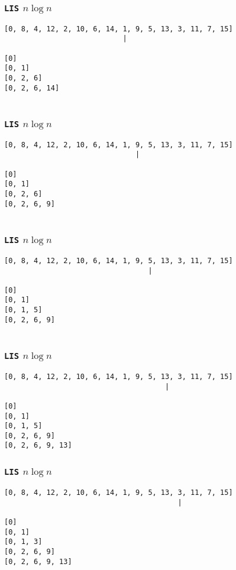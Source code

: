\documentclass{beamer}
\begin{document}
\begin{frame}[fragile]
	\frametitle{\texttt{LIS} $n\log n$}
\begin{verbatim}
[0, 8, 4, 12, 2, 10, 6, 14, 1, 9, 5, 13, 3, 11, 7, 15]
                            |

[0]
[0, 1]
[0, 2, 6]
[0, 2, 6, 14]


\end{verbatim}
\end{frame}
\addtocounter{framenumber}{-1}

\begin{frame}[fragile]
	\frametitle{\texttt{LIS} $n\log n$}
\begin{verbatim}
[0, 8, 4, 12, 2, 10, 6, 14, 1, 9, 5, 13, 3, 11, 7, 15]
                               |

[0]
[0, 1]
[0, 2, 6]
[0, 2, 6, 9]


\end{verbatim}
\end{frame}
\addtocounter{framenumber}{-1}

\begin{frame}[fragile]
	\frametitle{\texttt{LIS} $n\log n$}
\begin{verbatim}
[0, 8, 4, 12, 2, 10, 6, 14, 1, 9, 5, 13, 3, 11, 7, 15]
                                  |

[0]
[0, 1]
[0, 1, 5]
[0, 2, 6, 9]


\end{verbatim}
\end{frame}
\addtocounter{framenumber}{-1}

\begin{frame}[fragile]
	\frametitle{\texttt{LIS} $n\log n$}
\begin{verbatim}
[0, 8, 4, 12, 2, 10, 6, 14, 1, 9, 5, 13, 3, 11, 7, 15]
                                      |

[0]
[0, 1]
[0, 1, 5]
[0, 2, 6, 9]
[0, 2, 6, 9, 13]

\end{verbatim}
\end{frame}
\addtocounter{framenumber}{-1}

\begin{frame}[fragile]
	\frametitle{\texttt{LIS} $n\log n$}
\begin{verbatim}
[0, 8, 4, 12, 2, 10, 6, 14, 1, 9, 5, 13, 3, 11, 7, 15]
                                         |

[0]
[0, 1]
[0, 1, 3]
[0, 2, 6, 9]
[0, 2, 6, 9, 13]

\end{verbatim}
\end{frame}
\addtocounter{framenumber}{-1}
\end{document}
